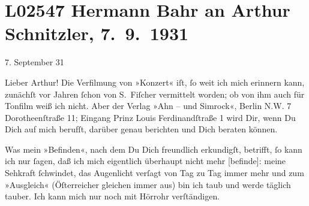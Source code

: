 

\section[Hermann Bahr an Arthur Schnitzler, 7. 9. 1931]{L02547 Hermann Bahr an Arthur Schnitzler, 7. 9. 1931}
\nopagebreak{}
\rehead{ }\normalsize\beginnumbering{}
\toendnotes[C]{\smallbreak\pagebreak[2]}
\toendnotes[C]{\smallbreak}
\pstart
           \raggedleft{}{\pb}7. September 31\pend
           
\pstart{}Lieber Arthur!\pend\vspace{0.5em}
\pstart
           Die Verfilmung von »Konzert« iſt, ſo weit ich mich erinnern kann,
               zunächſt vor Jahren ſchon von S. Fiſcher
               vermittelt worden; ob von ihm auch für Tonfilm weiß ich nicht. Aber der Verlag »Ahn – und Simrock«, Berlin N.W. 7 Dorotheenſtraße 11; Eingang Prinz Louis Ferdinandſtraße 1 wird Dir, wenn Du Dich auf mich berufſt,
               darüber genau berichten und Dich beraten können.\pend
           
\pstart
           Was mein »Befinden«, nach dem Du Dich freundlich erkundigſt, betrifft, ſo kann ich
               nur ſagen, daß ich mich eigentlich überhaupt nicht {\pb}mehr {[}befinde{]}: meine Sehkraft ſchwindet, das Augenlicht verſagt
               von Tag zu Tag immer mehr und zum »Ausgleich« (Öſterreicher gleichen immer aus) bin ich taub und werde täglich tauber. Ich
               kann mich nur noch mit Hörrohr verſtändigen.\pend
           
